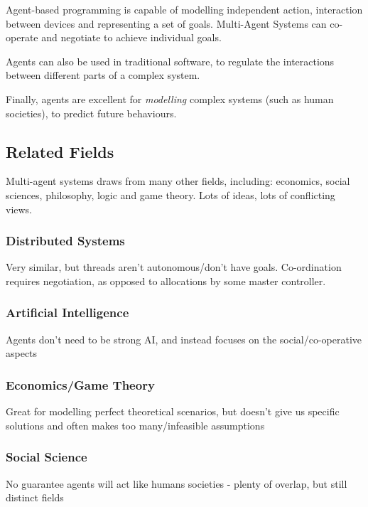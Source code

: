 Agent-based programming is capable of modelling independent action, interaction between devices and representing a set of goals. Multi-Agent Systems can co-operate and negotiate to achieve individual goals. 

Agents can also be used in traditional software, to regulate the interactions between different parts of a complex system. 

Finally, agents are excellent for \emph{modelling} complex systems (such as human societies), to predict future behaviours.

\subsection{Related Fields}

Multi-agent systems draws from many other fields, including: economics, social sciences, philosophy, logic and game theory. Lots of ideas, lots of conflicting views.

\subsubsection{Distributed Systems}
Very similar, but threads aren't autonomous/don't have goals. Co-ordination requires negotiation, as opposed to allocations by some master controller.

\subsubsection{Artificial Intelligence}
Agents don't need to be strong AI, and instead focuses on the social/co-operative aspects

\subsubsection{Economics/Game Theory}
Great for modelling perfect theoretical scenarios, but doesn't give us specific solutions and often makes too many/infeasible assumptions

\subsubsection{Social Science}
No guarantee agents will act like humans societies - plenty of overlap, but still distinct fields
